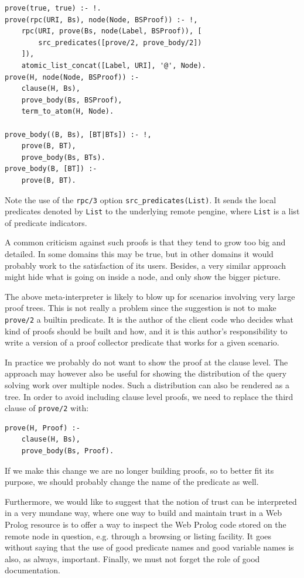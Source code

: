 \documentclass{tlp}
\begin{document}
\begin{lstlisting}
prove(true, true) :- !.
prove(rpc(URI, Bs), node(Node, BSProof)) :- !,
    rpc(URI, prove(Bs, node(Label, BSProof)), [
        src_predicates([prove/2, prove_body/2])
    ]),
    atomic_list_concat([Label, URI], '@', Node).
prove(H, node(Node, BSProof)) :-
    clause(H, Bs),
    prove_body(Bs, BSProof),
    term_to_atom(H, Node).

prove_body((B, Bs), [BT|BTs]) :- !,
    prove(B, BT),
    prove_body(Bs, BTs).
prove_body(B, [BT]) :-
    prove(B, BT).
\end{lstlisting}

\noindent Note the use of the \texttt{rpc/3} option \texttt{src\_predicates(List)}. It sends the local predicates denoted by
\texttt{List} to the underlying remote pengine, where \texttt{List} is a list of predicate indicators. 

A common criticism against such proofs is that they tend to grow too big and detailed. In some domains this may be true, but in other domains it would probably work to the satisfaction of its users. Besides, a very similar approach might hide what is going on inside a node, and only show the bigger picture.  

The above meta-interpreter is likely to blow up for scenarios involving very large proof trees. This is not really a problem since the suggestion is not to make \texttt{prove/2} a builtin predicate. It is the author of the client code who decides what kind of proofs should be built and how, and it is this author's responsibility to write a version of a proof collector predicate that works for a given scenario. 

In practice we probably do not want to show the proof at the clause level. The approach may however also be useful for showing the distribution of the query solving work over multiple nodes. Such a distribution can also be rendered as a tree. In order to avoid including clause level proofs, we need to replace the third clause of \texttt{prove/2} with:

\begin{lstlisting}
prove(H, Proof) :-
    clause(H, Bs),
    prove_body(Bs, Proof).
\end{lstlisting}

\noindent If we make this change we are no longer building proofs, so to better fit its purpose, we should probably change the name of the predicate as well.

Furthermore, we would like to suggest that the notion of trust can be interpreted in a very mundane way, where one way to build and maintain trust in a Web Prolog resource is to offer a way to inspect the Web Prolog code stored on the remote node in question, e.g. through a browsing or listing facility. It goes without saying that the use of good predicate names and good variable names is also, as always, important. Finally, we must not forget the role of good documentation.
\end{document}
